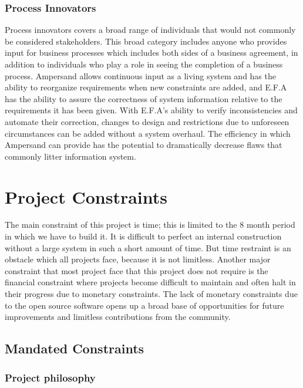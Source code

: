 \documentclass[12pt]{report}
\begin{document}
\subsection{Process Innovators}
Process innovators covers a broad range of individuals that would not commonly 
be considered stakeholders. This broad category includes anyone who provides 
input for business processes which includes both sides of a business agreement, 
in addition to individuals who play a role in seeing the completion of a 
business process. Ampersand allows continuous input as a living system and has 
the ability to reorganize requirements when new constraints are added, and 
E.F.A has the ability to assure the correctness of system information relative 
to the requirements it has been given. With E.F.A's ability to verify 
inconsistencies and automate their correction, changes to design and 
restrictions due to unforeseen circumstances can be added without a system 
overhaul. The efficiency in which Ampersand can provide has the potential to 
dramatically decrease flaws that commonly litter information system.


\chapter{Project Constraints}\label{ch:Constraints}
The main constraint of this project is time; this is limited to the 8 month 
period in which we have to build it. It is difficult to perfect an internal 
construction without a large system in such a short amount of time. But time 
restraint is an obstacle which all projects face, because it is not limitless. 
Another major constraint that most project face that this project does not 
require is the financial constraint where projects become difficult to maintain 
and often halt in their progress due to monetary constraints. The lack of 
monetary constraints due to the open source software opens up a broad base of 
opportunities for future improvements and limitless contributions from the 
community.
\section{Mandated Constraints}\label{sec:Constraints}

\subsection{Project philosophy}
\end{document}
